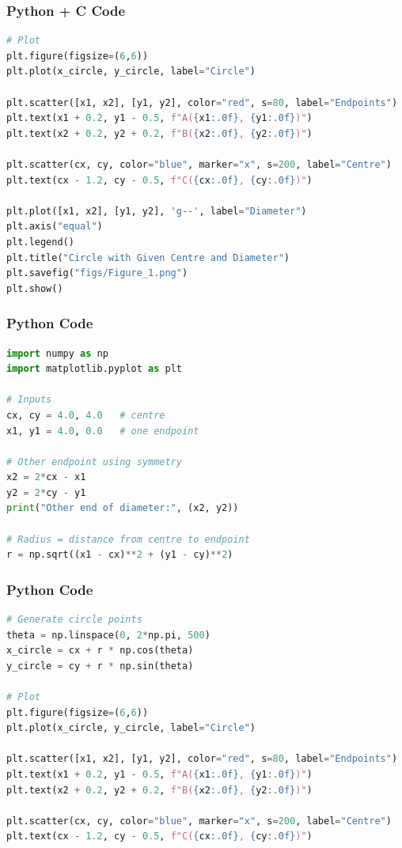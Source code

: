 \documentclass{beamer}
\begin{document}
\begin{frame}[fragile]
    \frametitle{Python + C Code}
    \begin{lstlisting}[language=Python]
# Plot
plt.figure(figsize=(6,6))
plt.plot(x_circle, y_circle, label="Circle")

plt.scatter([x1, x2], [y1, y2], color="red", s=80, label="Endpoints")
plt.text(x1 + 0.2, y1 - 0.5, f"A({x1:.0f}, {y1:.0f})")
plt.text(x2 + 0.2, y2 + 0.2, f"B({x2:.0f}, {y2:.0f})")

plt.scatter(cx, cy, color="blue", marker="x", s=200, label="Centre")
plt.text(cx - 1.2, cy - 0.5, f"C({cx:.0f}, {cy:.0f})")

plt.plot([x1, x2], [y1, y2], 'g--', label="Diameter")
plt.axis("equal")
plt.legend()
plt.title("Circle with Given Centre and Diameter")
plt.savefig("figs/Figure_1.png")
plt.show()
    \end{lstlisting}
\end{frame}

\begin{frame}[fragile]
    \frametitle{Python Code}
    \begin{lstlisting}[language=Python]
import numpy as np
import matplotlib.pyplot as plt

# Inputs
cx, cy = 4.0, 4.0   # centre
x1, y1 = 4.0, 0.0   # one endpoint

# Other endpoint using symmetry
x2 = 2*cx - x1
y2 = 2*cy - y1
print("Other end of diameter:", (x2, y2))

# Radius = distance from centre to endpoint
r = np.sqrt((x1 - cx)**2 + (y1 - cy)**2)
    \end{lstlisting}
\end{frame}

\begin{frame}[fragile]
    \frametitle{Python Code}
    \begin{lstlisting}[language=Python]
# Generate circle points
theta = np.linspace(0, 2*np.pi, 500)
x_circle = cx + r * np.cos(theta)
y_circle = cy + r * np.sin(theta)

# Plot
plt.figure(figsize=(6,6))
plt.plot(x_circle, y_circle, label="Circle")

plt.scatter([x1, x2], [y1, y2], color="red", s=80, label="Endpoints")
plt.text(x1 + 0.2, y1 - 0.5, f"A({x1:.0f}, {y1:.0f})")
plt.text(x2 + 0.2, y2 + 0.2, f"B({x2:.0f}, {y2:.0f})")

plt.scatter(cx, cy, color="blue", marker="x", s=200, label="Centre")
plt.text(cx - 1.2, cy - 0.5, f"C({cx:.0f}, {cy:.0f})")
    \end{lstlisting}
\end{frame}
\end{document}
